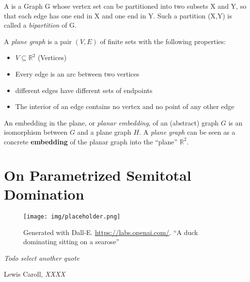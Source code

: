 \begin{definition}
    
A \textit{\bg} is a Graph G whose vertex set can be partitioned into two subsets X and Y, so that each edge has one end in X and one end in Y. Such a partition (X,Y) is called a \textit{bipartition} of G.

\end{definition}


\begin{definition}

A \textit{plane graph} is a pair $(V,E)$ of finite sets with the following properties:

\begin{itemize}
    \item $V \subseteq \mathbb{R}^2$ (Vertices)
    \item Every edge is an arc between two vertices 
    \item different edges have different sets of endpoints
    \item The interior of an edge contains no vertex and no point of any other edge
\end{itemize}

An embedding in the plane, or \textit{planar embedding}, of an (abstract) graph $G$ is an isomorphism between $G$ and a plane graph $H$. A \textit{plane graph} can be seen as a concrete \textbf{embedding} of the planar graph into the ``plane'' $\mathbb{R}^2$.

\end{definition}



\chapter{On Parametrized Semitotal Domination}

\vspace*{-50pt}

\begin{figure}[ht]
        \texttt{[image: img/placeholder.png]}
        \captionsetup{textformat=empty,labelformat=blank}
        \caption{Generated with Dall-E. \url{https://labs.openai.com/}. ``A duck dominating sitting on a searose''}
\end{figure}

\epigraph{\itshape Todo select another quote}{Lewis Caroll, \textit{XXXX}}



